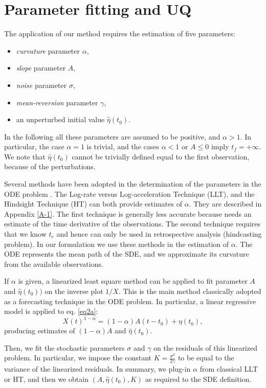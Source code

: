 \documentclass{article}
\begin{document}
\section{Parameter fitting and UQ}
The application of our method requires the estimation of five parameters:
\begin{itemize}
  \item {\it curvature} parameter $\alpha$,
  \item {\it slope} parameter $A$,
  \item {\it noise} parameter $\sigma$,
  \item {\it mean-reversion} parameter $\gamma$,
  \item an unperturbed initial value $\hat\eta(t_0)$.
\end{itemize}
In the following all these parameters are assumed to be positive, and $\alpha > 1$. In particular, the case $\alpha=1$ is trivial, and the cases $\alpha <1$ or $A\le0$ imply $t_f=+\infty$. We note that $\hat\eta(t_0)$ cannot be trivially defined equal to the first observation, because of the perturbations.

Several methods have been adopted in the determination of the parameters in the ODE problem \citep{Voight1988, Cornelius1995}. The Log-rate versus Log-acceleration Technique (LLT), and the Hindsight Technique (HT) can both provide estimates of $\alpha$. They are described in Appendix \ref{A-1}. The first technique is generally less accurate because needs an estimate of the time derivative of the observations. The second technique requires that we know $t_e$ and hence can only be used in retrospective analysis (hindcasting problem). In our formulation we use these methods in the estimation of $\alpha$. The ODE represents the mean path of the SDE, and we approximate its curvature from the available observations.

If $\alpha$ is given, a linearized least square method can be applied to fit parameter $A$ and $\hat\eta(t_0))$ on the inverse plot $1/X$. This is the main method classically adopted as a forecasting technique in the ODE problem. In particular, a linear regressive model is applied to eq. \ref{eq2a}:
$$X(t)^{1-\alpha}=(1-\alpha)A(t-t_0)+\eta(t_0),$$
producing estimates of $(1-\alpha)A$ and $\hat\eta(t_0)$.

Then, we fit the stochastic parameters $\sigma$ and $\gamma$ on the residuals of this linearized problem. In particular, we impose the constant $K=\frac{\sigma^2}{2\gamma}$ to be equal to the variance of the linearized residuals. In summary, we plug-in $\alpha$ from classical LLT or HT, and then we obtain $\left(A,\hat\eta(t_0),K\right)$ as required to the SDE definition.
\end{document}
